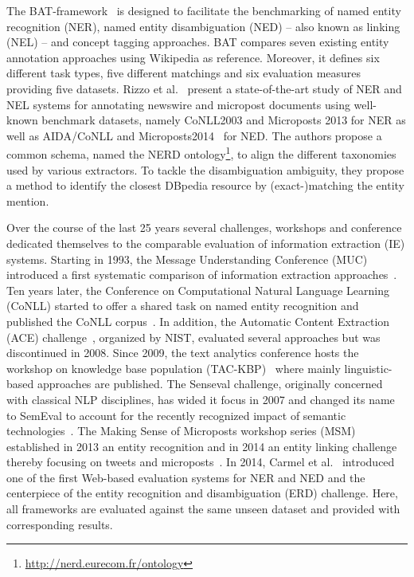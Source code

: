 The BAT-framework~\cite{cornolti} is designed to facilitate the benchmarking of named entity recognition (NER), named entity disambiguation (NED) -- also known as linking (NEL) -- and concept tagging approaches.
BAT compares seven existing entity annotation approaches using Wikipedia as reference.
Moreover, it defines six different task types, five different matchings and six evaluation measures providing five datasets.
Rizzo et al.~\cite{rizzo2014}  present a state-of-the-art study of NER and NEL systems for annotating newswire and micropost documents using well-known benchmark datasets, namely CoNLL2003 and Microposts 2013 for NER as well as AIDA/CoNLL and Microposts2014~\cite{Cano2014} for NED. 
The authors propose a common schema, named the NERD ontology\footnote{\url{http://nerd.eurecom.fr/ontology}}, to align the different taxonomies used by various extractors. To tackle the disambiguation ambiguity, they propose a method to identify the closest DBpedia resource by (exact-)matching the entity mention.

Over the course of the last 25 years several challenges, workshops and conference dedicated themselves to the comparable evaluation of information extraction (IE) systems. 
Starting in 1993, the Message Understanding Conference (MUC) introduced a first systematic comparison of information extraction approaches~\cite{Sundheim:1993:TIE:1072017.1072023}.
Ten years later, the Conference on Computational Natural Language Learning (CoNLL) started to offer a shared task on named entity recognition and published the CoNLL corpus~\cite{conll2003}.
In addition, the Automatic Content Extraction (ACE) challenge~\cite{doddington2004automatic}, organized by NIST, evaluated several approaches but was discontinued in 2008. 
Since 2009, the text analytics conference hosts the workshop on knowledge base population (TAC-KBP)~\cite{mcnamee2009overview} where mainly linguistic-based approaches are published.
The Senseval challenge, originally concerned with classical NLP disciplines, has wided it focus in 2007 and changed its name to SemEval to account for the recently recognized impact of semantic technologies~\cite{kilgarri1998senseval}.
The Making Sense of Microposts workshop series (MSM) established in 2013 an entity recognition and in 2014 an entity linking challenge thereby focusing on tweets and microposts~\cite{MSM2014}.
In 2014, Carmel et al.~\cite{ERD2014} introduced one of the first Web-based evaluation systems for NER and NED and the centerpiece of the entity recognition and disambiguation (ERD) challenge. Here, all frameworks are evaluated against the same unseen dataset and provided with corresponding results. 

